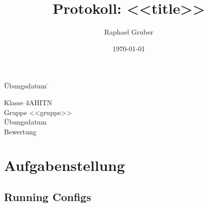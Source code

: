 \documentclass[a4paper, ngerman]{article}
\author{Raphael Gruber}
\title{Protokoll: <<title>>}
\date{\origdate\today}
\begin{document}
\begin{titlingpage}

	\maketitle

	\vfill

	\vspace{-100pt}

	\begin{center}

		\begin{tabbing}

			Übungsdatum \quad \= \kill

			Klasse \> 4AHITN \\

			Gruppe \> <<gruppe>> \\

			Übungsdatum \>  \\[20pt]

			Bewertung \>

		\end{tabbing}

	\end{center}

\end{titlingpage}



\tableofcontents

\newpage

\section{Aufgabenstellung}

\begin{appendices}
	
	\section{Running Configs}
	
	\listoffigures
		
	\listoftables
\end{appendices}
\end{document}
